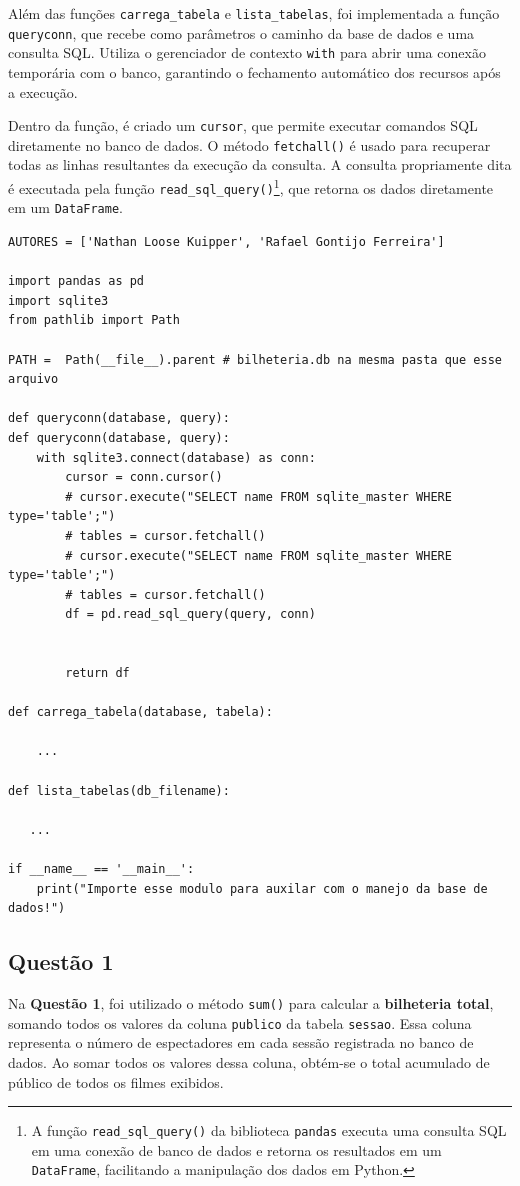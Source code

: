 \documentclass{article}
\begin{document}
Além das funções \texttt{carrega\_tabela} e \texttt{lista\_tabelas}, foi implementada a função \texttt{queryconn}, que recebe como parâmetros o caminho da base de dados e uma consulta SQL. Utiliza o gerenciador de contexto \texttt{with} para abrir uma conexão temporária com o banco, garantindo o fechamento automático dos recursos após a execução.

Dentro da função, é criado um \texttt{cursor}, que permite executar comandos SQL diretamente no banco de dados. O método \texttt{fetchall()} é usado para recuperar todas as linhas resultantes da execução da consulta. A consulta propriamente dita é executada pela função \texttt{read\_sql\_query()}\footnote{A função \texttt{read\_sql\_query()} da biblioteca \texttt{pandas} executa uma consulta SQL em uma conexão de banco de dados e retorna os resultados em um \texttt{DataFrame}, facilitando a manipulação dos dados em Python.}, que retorna os dados diretamente em um \texttt{DataFrame}.


\linespread{1}
\begin{lstlisting}
AUTORES = ['Nathan Loose Kuipper', 'Rafael Gontijo Ferreira']

import pandas as pd 
import sqlite3
from pathlib import Path

PATH =  Path(__file__).parent # bilheteria.db na mesma pasta que esse arquivo

def queryconn(database, query):    
def queryconn(database, query):    
    with sqlite3.connect(database) as conn:
        cursor = conn.cursor()
        # cursor.execute("SELECT name FROM sqlite_master WHERE type='table';")
        # tables = cursor.fetchall() 
        # cursor.execute("SELECT name FROM sqlite_master WHERE type='table';")
        # tables = cursor.fetchall() 
        df = pd.read_sql_query(query, conn)


        return df
    
def carrega_tabela(database, tabela):

    ...

def lista_tabelas(db_filename):

   ...
    
if __name__ == '__main__':
    print("Importe esse modulo para auxilar com o manejo da base de dados!")
\end{lstlisting}
\pagebreak
\linespread{1.5}
\subsection*{Questão 1}
Na \textbf{Questão 1}, foi utilizado o método \texttt{sum()} para calcular a \textbf{bilheteria total}, somando todos os valores da coluna \texttt{publico} da tabela \texttt{sessao}. Essa coluna representa o número de espectadores em cada sessão registrada no banco de dados. Ao somar todos os valores dessa coluna, obtém-se o total acumulado de público de todos os filmes exibidos.
\end{document}
